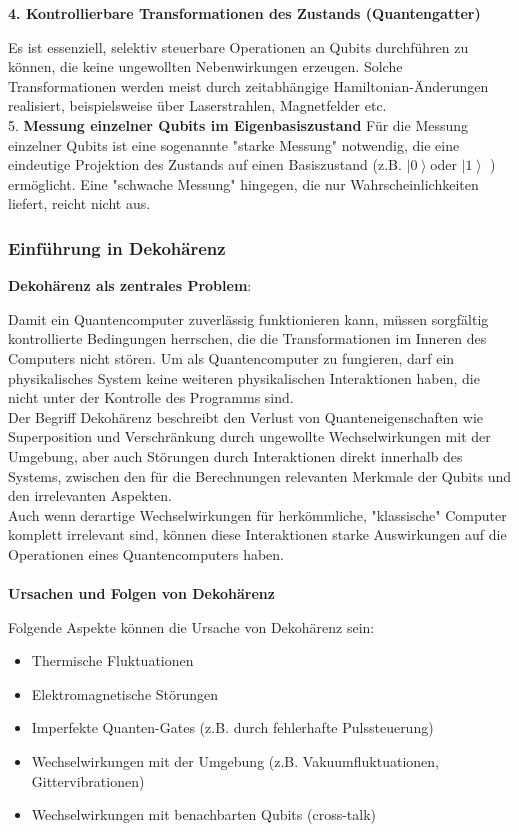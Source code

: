  
\textbf{4. Kontrollierbare Transformationen des Zustands (Quantengatter)}

Es ist essenziell, selektiv steuerbare Operationen an Qubits durchführen zu können, die keine ungewollten Nebenwirkungen erzeugen. Solche Transformationen werden meist durch zeitabhängige Hamiltonian-Änderungen realisiert, beispielsweise über Laserstrahlen, Magnetfelder etc. \\


5. \textbf{Messung einzelner Qubits im Eigenbasiszustand} 
Für die Messung einzelner Qubits ist eine sogenannte "starke Messung" notwendig, die eine eindeutige Projektion des Zustands auf einen Basiszustand (z.B.  \(\left| 0\right\rangle\)oder \(\left| 1 \right\rangle\) ) ermöglicht. Eine "schwache Messung" hingegen, die nur Wahrscheinlichkeiten liefert, reicht nicht aus. 

\cite{divincenzo_topics_nodate}
 
\subsubsection{Einführung in Dekohärenz }

\textbf{Dekohärenz als zentrales Problem}: 

Damit ein Quantencomputer zuverlässig funktionieren kann, müssen sorgfältig kontrollierte Bedingungen herrschen, die die Transformationen im Inneren des Computers nicht stören. Um als Quantencomputer zu fungieren, darf ein physikalisches System keine weiteren physikalischen Interaktionen haben, die nicht unter der Kontrolle des Programms sind. \\
Der Begriff Dekohärenz beschreibt den Verlust von Quanteneigenschaften wie Superposition und Verschränkung durch ungewollte Wechselwirkungen mit der Umgebung, aber auch Störungen durch Interaktionen direkt innerhalb des Systems, zwischen den für die Berechnungen relevanten Merkmale der Qubits und den irrelevanten Aspekten. \\
Auch wenn derartige Wechselwirkungen für herkömmliche, "klassische" Computer komplett irrelevant sind, können diese Interaktionen starke Auswirkungen auf die Operationen eines Quantencomputers haben. 
\cite{mermin_quantum_2012}\\
\\
\textbf{Ursachen und Folgen von Dekohärenz}

Folgende Aspekte können die Ursache von Dekohärenz sein:\\
\begin{itemize}
    \item Thermische Fluktuationen
    \item Elektromagnetische Störungen
    \item Imperfekte Quanten-Gates (z.B. durch fehlerhafte Pulssteuerung)
    \item Wechselwirkungen mit der Umgebung (z.B. Vakuumfluktuationen, Gittervibrationen)
    \item Wechselwirkungen mit benachbarten Qubits (cross-talk)
\end{itemize}

